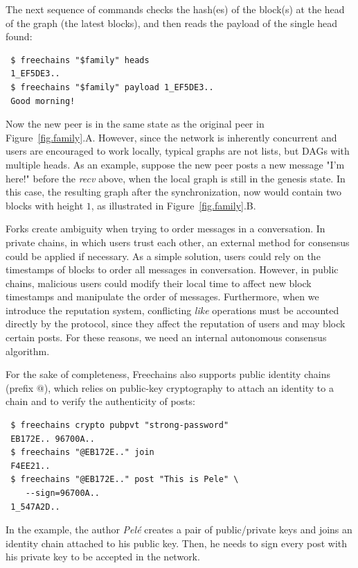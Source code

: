 \documentclass[10pt,journal,compsoc]{IEEEtran}
\newcommand{\FC}   {Freechains\xspace}
\begin{document}
The next sequence of commands checks the hash(es) of the block(s) at the head
of the graph (the latest blocks), and then reads the payload of the single head
found:

{\footnotesize
\begin{verbatim}
 $ freechains "$family" heads
 1_EF5DE3..
 $ freechains "$family" payload 1_EF5DE3..
 Good morning!
\end{verbatim}
}

Now the new peer is in the same state as the original peer in
Figure~\ref{fig.family}.A.
However, since the network is inherently concurrent and users are encouraged to
work locally, typical graphs are not lists, but DAGs with multiple heads.
As an example, suppose the new peer posts a new message "I'm here!" before the
\emph{recv} above, when the local graph is still in the genesis state.
In this case, the resulting graph after the synchronization, now would contain
two blocks with height $1$, as illustrated in Figure~\ref{fig.family}.B.

Forks create ambiguity when trying to order messages in a conversation.
In private chains, in which users trust each other, an external method for
consensus could be applied if necessary.
As a simple solution, users could rely on the timestamps of blocks to order all
messages in conversation.
However, in public chains, malicious users could modify their local time to
affect new block timestamps and manipulate the order of messages.
Furthermore, when we introduce the reputation system, conflicting \emph{like}
operations must be accounted directly by the protocol, since they affect the
reputation of users and may block certain posts.
For these reasons, we need an internal autonomous consensus algorithm.

For the sake of completeness, \FC also supports public identity chains (prefix
$@$), which relies on public-key cryptography to attach an identity to a chain
and to verify the authenticity of posts:

{\footnotesize
\begin{verbatim}
 $ freechains crypto pubpvt "strong-password"
 EB172E.. 96700A..
 $ freechains "@EB172E.." join
 F4EE21..
 $ freechains "@EB172E.." post "This is Pele" \
    --sign=96700A..
 1_547A2D..
\end{verbatim}
}

In the example, the author \emph{Pel\'e} creates a pair of public/private
keys and joins an identity chain attached to his public key.
Then, he needs to sign every post with his private key to be accepted in the
network.
\end{document}
